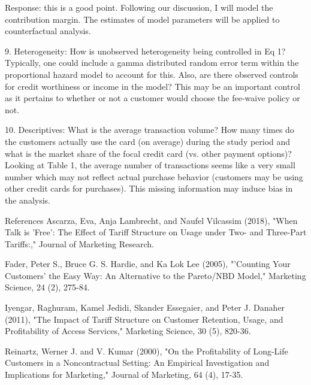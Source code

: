\documentclass[titlepage,12pt,letterpaper]{article}
\numberwithin{equation}{section}
\begin{document}
Response: this is a good point. Following our discussion, I will model the contribution margin. The estimates of model parameters will be applied to counterfactual analysis.  

9.	Heterogeneity: How is unobserved heterogeneity being controlled in Eq 1? Typically, one could include a gamma distributed random error term within the proportional hazard model to account for this. Also, are there observed controls for credit worthiness or income in the model? This may be an important control as it pertains to whether or not a customer would choose the fee-waive policy or not.

10.	Descriptives: What is the average transaction volume? How many times do the customers actually use the card (on average) during the study period and what is the market share of the focal credit card (vs. other payment options)? Looking at Table 1, the average number of transactions seems like a very small number which may not reflect actual purchase behavior (customers may be using other credit cards for purchases). This missing information may induce bias in the analysis.

References
Ascarza, Eva, Anja Lambrecht, and Naufel Vilcassim (2018), "When Talk is 'Free': The Effect of Tariff Structure on Usage under Two- and Three-Part Tariffs:," Journal of Marketing Research.

Fader, Peter S., Bruce G. S. Hardie, and Ka Lok Lee (2005), "'Counting Your Customers' the Easy Way: An Alternative to the Pareto/NBD Model," Marketing Science, 24 (2), 275-84.

Iyengar, Raghuram, Kamel Jedidi, Skander Essegaier, and Peter J. Danaher (2011), "The Impact of Tariff Structure on Customer Retention, Usage, and Profitability of Access Services," Marketing Science, 30 (5), 820-36.

Reinartz, Werner J. and V. Kumar (2000), "On the Profitability of Long-Life Customers in a Noncontractual Setting: An Empirical Investigation and Implications for Marketing," Journal of Marketing, 64 (4), 17-35.
\end{document}
